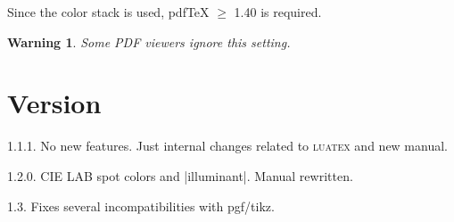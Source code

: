 \documentclass[a4paper]{ltxguide}
\newtheorem{warning}{Warning}
\begin{document}
Since the color stack is used, pdf\TeX{} $\ge$ 1.40 is required.

\begin{warning}
  Some PDF viewers ignore this setting.
\end{warning}

\section{Version}

1.1.1. No new features. Just internal changes related to
\textsc{luatex} and new manual.

1.2.0. CIE LAB spot colors and |illuminant|. Manual rewritten.

1.3. Fixes several incompatibilities with \textsf{pgf}/\textsf{tikz}. 
\end{document}
